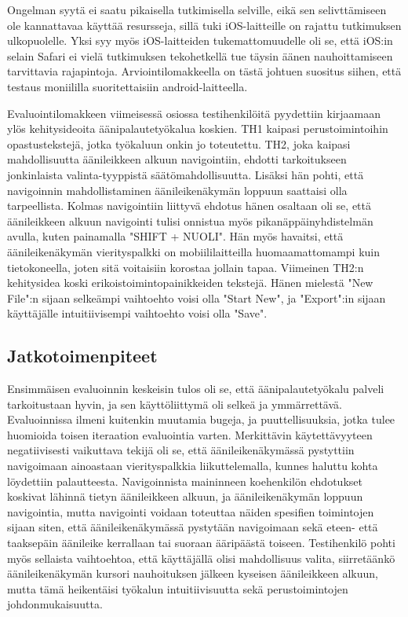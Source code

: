 \documentclass[utf8]{gradu3}
\begin{document}
Ongelman syytä ei saatu pikaisella tutkimisella selville, eikä sen selivttämiseen ole kannattavaa käyttää resursseja, sillä tuki iOS-laitteille on rajattu tutkimuksen ulkopuolelle. Yksi syy myös iOS-laitteiden tukemattomuudelle oli se, että iOS:in selain Safari ei vielä tutkimuksen tekohetkellä tue täysin äänen nauhoittamiseen tarvittavia rajapintoja. Arviointilomakkeella on tästä johtuen suositus siihen, että testaus moniililla suoritettaisiin android-laitteella. 

Evaluointilomakkeen viimeisessä osiossa testihenkilöitä pyydettiin kirjaamaan ylös kehitysideoita äänipalautetyökalua koskien. TH1 kaipasi perustoimintoihin opastustekstejä, jotka työkaluun onkin jo toteutettu. TH2, joka kaipasi mahdollisuutta äänileikkeen alkuun navigointiin, ehdotti tarkoitukseen jonkinlaista valinta-tyyppistä säätömahdollisuutta. Lisäksi hän pohti, että navigoinnin mahdollistaminen äänileikenäkymän loppuun saattaisi olla tarpeellista. Kolmas navigointiin liittyvä ehdotus hänen osaltaan oli se, että äänileikkeen alkuun navigointi tulisi onnistua myös pikanäppäinyhdistelmän avulla, kuten painamalla "SHIFT + NUOLI". Hän myös havaitsi, että äänileikenäkymän vierityspalkki on mobiililaitteilla huomaamattomampi kuin tietokoneella, joten sitä voitaisiin korostaa jollain tapaa. Viimeinen TH2:n kehitysidea koski erikoistoimintopainikkeiden tekstejä. Hänen mielestä "New File":n sijaan selkeämpi vaihtoehto voisi olla "Start New", ja "Export":in sijaan käyttäjälle intuitiivisempi vaihtoehto voisi olla "Save". 

\subsection{Jatkotoimenpiteet}

Ensimmäisen evaluoinnin keskeisin tulos oli se, että äänipalautetyökalu palveli tarkoitustaan hyvin, ja sen käyttöliittymä oli selkeä ja ymmärrettävä. Evaluoinnissa ilmeni kuitenkin muutamia bugeja, ja puuttellisuuksia, jotka tulee huomioida toisen iteraation evaluointia varten. Merkittävin käytettävyyteen negatiivisesti vaikuttava tekijä oli se, että äänileikenäkymässä pystyttiin navigoimaan ainoastaan vierityspalkkia liikuttelemalla, kunnes haluttu kohta löydettiin palautteesta. Navigoinnista maininneen koehenkilön ehdotukset koskivat lähinnä tietyn äänileikkeen alkuun, ja äänileikenäkymän loppuun navigointia, mutta navigointi voidaan toteuttaa näiden spesifien toimintojen sijaan siten, että äänileikenäkymässä pystytään navigoimaan sekä eteen- että taaksepäin äänileike kerrallaan tai suoraan ääripäästä toiseen. Testihenkilö pohti myös sellaista vaihtoehtoa, että käyttäjällä olisi mahdollisuus valita, siirretäänkö äänileikenäkymän kursori nauhoituksen jälkeen kyseisen äänileikkeen alkuun, mutta tämä heikentäisi työkalun intuitiivisuutta sekä perustoimintojen johdonmukaisuutta.
\end{document}
